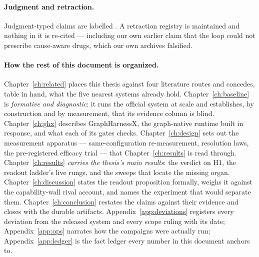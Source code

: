 \paragraph{Judgment and retraction.} Judgment-typed claims are labelled
. A retraction registry is maintained and nothing in it is
re-cited --- including our own earlier claim that the loop could not
prescribe cause-aware drugs, which our own archives falsified.

\paragraph{How the rest of this document is organized.}
Chapter~\ref{ch:related} places this thesis against four literature
routes and concedes, table in hand, what the five nearest systems already
hold. Chapter~\ref{ch:baseline} is \emph{formative and diagnostic}: it
runs the official system at scale and establishes, by construction and by
measurement, that its evidence column is blind. Chapter~\ref{ch:ghx}
describes GraphHarnessX, the graph-native runtime built in response, and
what each of its gates checks. Chapter~\ref{ch:design} sets out the
measurement apparatus --- same-configuration re-measurement, resolution
laws, the pre-registered efficacy trial --- that
Chapter~\ref{ch:results} is read through. Chapter~\ref{ch:results}
\emph{carries the thesis's main results}: the verdict on H1, the readout
ladder's live rungs, and the sweeps that locate the missing organ.
Chapter~\ref{ch:discussion} states the readout proposition formally,
weighs it against the capability-wall rival account, and names the
experiment that would separate them. Chapter~\ref{ch:conclusion} restates
the claims against their evidence and closes with the durable artifacts.
Appendix~\ref{app:deviations} registers every deviation from the released
system and every scope ruling with its date; Appendix~\ref{app:ops}
narrates how the campaigns were actually run; Appendix~\ref{app:ledger}
is the fact ledger every number in this document anchors to.
